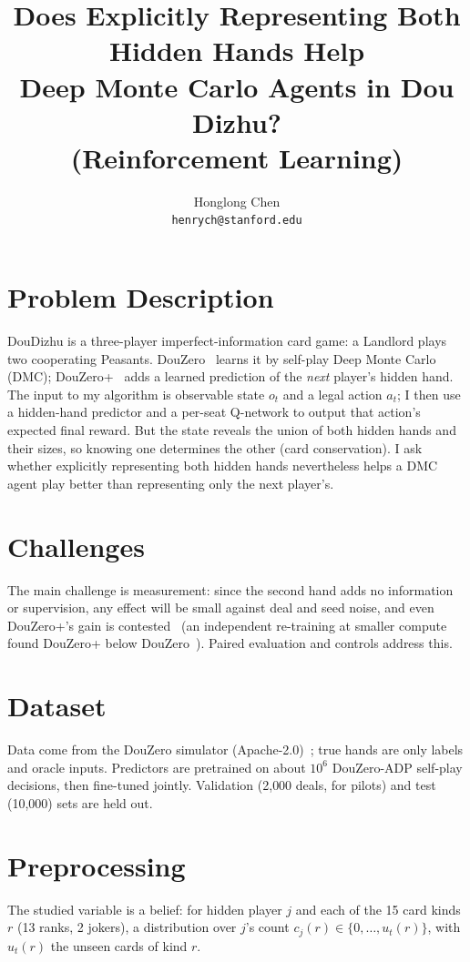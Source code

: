 \documentclass{article}
\title{Does Explicitly Representing Both Hidden Hands Help\\Deep Monte Carlo Agents in Dou Dizhu? \\[0.4em]
  \large (Reinforcement Learning)}
\author{%
  Honglong Chen \\
  \texttt{henrych@stanford.edu}
}
\begin{document}
\maketitle

\section{Problem Description}
DouDizhu is a three-player imperfect-information card game: a Landlord plays two cooperating Peasants.
DouZero~\cite{zha2021douzero} learns it by self-play Deep Monte Carlo (DMC); DouZero+~\cite{zhao2022douzeroplus,zhao2024fulldouzeroplus} adds a learned prediction of the \emph{next} player's hidden hand.
The input to my algorithm is observable state $o_t$ and a legal action $a_t$; I then use a hidden-hand predictor and a per-seat Q-network to output that action's expected final reward.
But the state reveals the union of both hidden hands and their sizes, so knowing one determines the other (card conservation).
I ask whether explicitly representing both hidden hands nevertheless helps a DMC agent play better than representing only the next player's.

\section{Challenges}
The main challenge is measurement: since the second hand adds no information or supervision, any effect will be small against deal and seed noise, and even DouZero+'s gain is contested~\cite{lei2024alphadou} (an independent re-training at smaller compute found DouZero+ below DouZero~\cite{luo2024oadmcdou}).
Paired evaluation and controls address this.

\section{Dataset}
Data come from the DouZero simulator (Apache-2.0)~\cite{douzerocode}; true hands are only labels and oracle inputs.
Predictors are pretrained on about $10^6$ DouZero-ADP self-play decisions, then fine-tuned jointly.
Validation (2{,}000 deals, for pilots) and test (10{,}000) sets are held out.

\section{Preprocessing}
The studied variable is a belief: for hidden player $j$ and each of the 15 card kinds $r$ (13 ranks, 2 jokers), a distribution over $j$'s count $c_j(r)\in\{0,\dots,u_t(r)\}$, with $u_t(r)$ the unseen cards of kind $r$.
\end{document}
